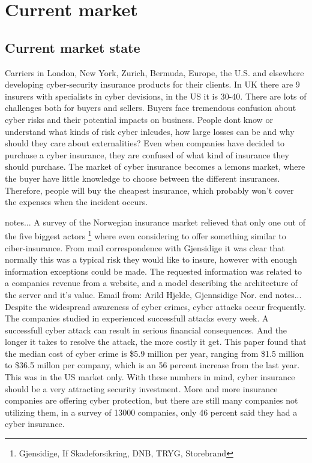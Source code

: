 \chapter{Current market}
\label{chp:hvahardenneaasi??} 
\section{Current market state}
Carriers in London, New York, Zurich, Bermuda, Europe, the U.S. and 
elsewhere developing cyber-security insurance products for their clients.
In UK there are 9 insurers with specialists in cyber devisions, 
in the US it is 30-40. \cite{evolvingcyber}
There are lots of challenges both for buyers and sellers. 
Buyers face tremendous confusion about cyber risks and their potential impacts on business. 
People dont know or understand what kinds of risk cyber inlcudes, 
how large losses can be and why should they care about externalities?
\cite{Cyberworkshop} 
Even when companies have decided to purchase a cyber insurance, they are confused of what kind of insurance they should purchase.
The market of cyber insurance becomes a lemons market, where the buyer have little knowledge to choose between the different insurances. 
Therefore, people will buy the cheapest insurance, which probably won't cover the expenses when the incident occurs. 

notes...
A survey of the Norwegian insurance market relieved that only one out of the five biggest actors \footnote{Gjensidige, If Skadeforsikring, DNB, TRYG, Storebrand} where even considering to offer something similar to ciber-insurance. From mail correspondence with Gjensidige it was clear that normally this was a typical risk they would like to insure, however with enough information exceptions could be made. The requested information was related to a companies revenue from a website, and a model describing the architecture of the server and it's value. 
Email from: Arild Hjelde, Gjennsidige Nor.  
end notes...
\\

Despite the widespread awareness of cyber crimes, cyber attacks occur frequently. 
The companies studied in \cite{ccost} experienced successfull attacks every week.
 A successfull cyber attack can result in serious financial consequences. 
 And the longer it takes to resolve the attack, the more costly it get. 
 This paper found that the median cost of cyber crime is \$5.9 million per year, 
 ranging from \$1.5 million to \$36.5 millon per company, 
 which is an 56 percent increase from the last year. This was in the US market only. 
 With these numbers in mind, cyber insurance should be a very attracting security investment. 
 More and more insurance companies are offering cyber protection,
  but there are still many companies not utilizing them, in a survey of 13000 companies, 
  only 46 percent said they had a cyber insurance. \cite{compworld} 

